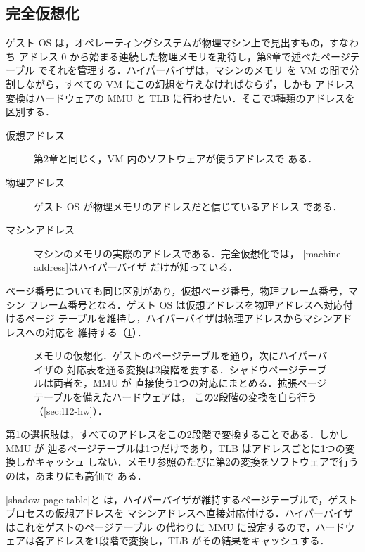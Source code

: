 \documentclass[../main.tex]{subfiles}
\begin{document}
\subsection{完全仮想化}

ゲスト OS は，オペレーティングシステムが物理マシン上で見出すもの，すなわち
アドレス 0 から始まる連続した物理メモリを期待し，第8章で述べたページテーブル
でそれを管理する．ハイパーバイザは，マシンのメモリ
を VM の間で分割しながら，すべての VM にこの幻想を与えなければならず，しかも
アドレス変換はハードウェアの MMU と TLB に行わせたい．そこで3種類のアドレスを
区別する．
\begin{description}
  \item[仮想アドレス] 第2章と同じく，VM 内のソフトウェアが使うアドレスで
    ある．
  \item[物理アドレス] ゲスト OS が物理メモリのアドレスだと信じているアドレス
    である．
  \item[マシンアドレス] マシンのメモリの実際のアドレスである．完全仮想化では，
    [machine address]はハイパーバイザ
    だけが知っている．
\end{description}
ページ番号についても同じ区別があり，仮想ページ番号，物理フレーム番号，マシン
フレーム番号となる．ゲスト OS は仮想アドレスを物理アドレスへ対応付けるページ
テーブルを維持し，ハイパーバイザは物理アドレスからマシンアドレスへの対応を
維持する（\cref{fig:l12-memory}）．

\begin{figure}[htbp]
  \centering
  
  \caption{メモリの仮想化．ゲストのページテーブルを通り，次にハイパーバイザの
    対応表を通る変換は2段階を要する．シャドウページテーブルは両者を，MMU が
    直接使う1つの対応にまとめる．拡張ページテーブルを備えたハードウェアは，
    この2段階の変換を自ら行う（\cref{sec:l12-hw}）．}
  \label{fig:l12-memory}
\end{figure}

第1の選択肢は，すべてのアドレスをこの2段階で変換することである．しかし MMU が
辿るページテーブルは1つだけであり，TLB はアドレスごとに1つの変換しかキャッシュ
しない．メモリ参照のたびに第2の変換をソフトウェアで行うのは，あまりにも高価で
ある．

\begin{definition}[シャドウページテーブル]
  [shadow page table]と
  は，ハイパーバイザが維持するページテーブルで，ゲストプロセスの仮想アドレスを
  マシンアドレスへ直接対応付ける．ハイパーバイザはこれをゲストのページテーブル
  の代わりに MMU に設定するので，ハードウェアは各アドレスを1段階で変換し，TLB
  がその結果をキャッシュする．
\end{definition}
\end{document}
